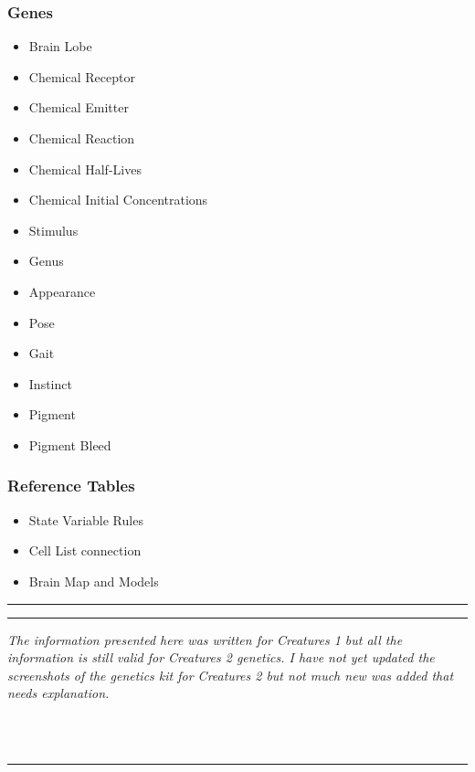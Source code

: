 \documentclass[11pt,twoside,a4paper]{article}
\begin{document}
\begin{minipage}{0.5\linewidth}
			\subsubsection{Genes}
			\begin{itemize}
				\item Brain Lobe
				\item Chemical Receptor
				\item Chemical Emitter
				\item Chemical Reaction
				\item Chemical Half-Lives
				\item Chemical Initial Concentrations
				\item Stimulus
				\item Genus
				\item Appearance
				\item Pose
				\item Gait
				\item Instinct
				\item Pigment
				\item Pigment Bleed
			\end{itemize}
\end{minipage}
\begin{minipage}{0.1\linewidth}\end{minipage}
\begin{minipage}{0.4\linewidth}
			\subsubsection{Reference Tables}
			\begin{itemize}
				\item State Variable Rules
				\item Cell List connection~\cite{genornics}
				\item Brain Map and Models~\cite{genornics}
			\end{itemize}
			
			\rule{3cm}{0.25mm}
			
			\rule{3cm}{0.25mm}
			
			\emph{The information presented here was written for Creatures 1 but all the information is still valid for Creatures 2 genetics. I have not yet updated the screenshots of the genetics kit for Creatures 2 but not much new was added that needs explanation.}
\end{minipage}
~\\~\\
\rule{10cm}{0.5mm}
\end{document}
